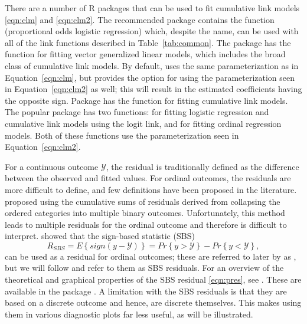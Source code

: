 There are a number of R packages that can be used to fit cumulative link models \eqref{eqn:clm} and \eqref{eqn:clm2}. The recommended package  \citep{pkg-MASS} contains the function  (proportional odds logistic regression) which, despite the name, can be used with all of the link functions described in Table~\ref{tab:common}. The  package \citep{pkg-VGAM} has the  function for fitting vector generalized linear models, which includes the broad class of cumulative link models. By default,  uses the same parameterization as in Equation~\eqref{eqn:clm}, but provides the option for using the parameterization seen in Equation~\eqref{eqn:clm2} as well; this will result in the estimated coefficients having the opposite sign. Package  \citep{pkg-ordinal} has the  function for fitting cumulative link models. The popular  package \citep{pkg-rms} has two functions:  for fitting logistic regression and cumulative link models using the logit link, and  for fitting ordinal regression models. Both of these functions use the parameterization seen in Equation~\eqref{eqn:clm2}.

For a continuous outcome $\mathcal{Y}$, the residual is traditionally defined as the difference between the observed and fitted values. For ordinal outcomes, the residuals are more difficult to define, and few definitions have been proposed in the literature. \citet{graphical-liu-2009} proposed using the cumulative sums of residuals derived from collapsing the ordered categories into multiple binary outcomes. Unfortunately, this method leads to multiple residuals for the ordinal outcome and therefore is difficult to interpret. \citet{residuals-li-2012} showed that the sign-based statistic (SBS)
\begin{equation}
\label{eqn:pres}
  R_{SBS} = E\left\{sign\left(y - \mathcal{Y}\right)\right\} = Pr\left\{y > \mathcal{Y}\right\} - Pr\left\{y < \mathcal{Y}\right\},
\end{equation}
can be used as a residual for ordinal outcomes; these are referred to later by \citeauthor{residuals-li-2012} as , but we will follow \citet{residuals-liu-2017} and refer to them as SBS residuals. For an overview of the theoretical and graphical properties of the SBS residual \eqref{eqn:pres}, see \citet{residuals-liu-2017}. These are available in the  package \citep{pkg-PResiduals}. A limitation with the SBS residuals is that they are based on a discrete outcome and hence, are discrete themselves. This makes using them in various diagnostic plots far less useful, as will be illustrated.



